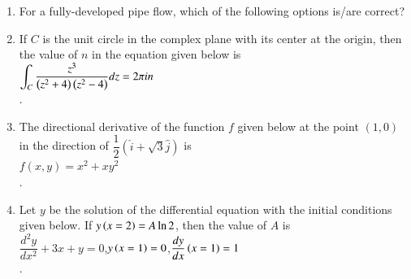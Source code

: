 \documentclass[journal]{IEEEtran}
\begin{document}
\begin{enumerate}[leftmargin=0pt]
\item
For a fully-developed pipe flow, which of the following options is/are correct?
\begin{enumerate}
\end{enumerate}
\hfill{}

\item
If $C$ is the unit circle in the complex plane with its center at the origin, then the value of $n$ in the equation given below is\\
$\displaystyle \int_C \dfrac{z^3}{\left(z^2+4\right)\left(z^2-4\right)}dz = 2\pi i n$\\
\underline{\hspace{2cm}} .

\hfill{}

\item
The directional derivative of the function $f$ given below at the point $(1,0)$ in the direction of $\dfrac{1}{2}\left(\hat{i}+ \sqrt{3}\hat{j}\right)$ is\\
$f(x,y) = x^2 + x y^2$\\
\underline{\hspace{2cm}} .

\hfill{}

\item
Let $y$ be the solution of the differential equation with the initial conditions given below. If $y\left(x = 2\right) = A \ln 2$, then the value of $A$ is\\
$\dfrac{d^2y}{dx^2} + 3x + y= 0$,\quad $y\left(x = 1\right) = 0$,\quad $\dfrac{dy}{dx}\left(x = 1\right)=1$\\
\underline{\hspace{2cm}} .

\hfill{}


\end{enumerate}
\end{document}
